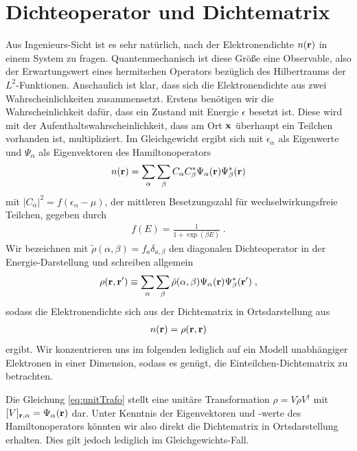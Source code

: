 \section{Dichteoperator und Dichtematrix}
Aus Ingenieurs-Sicht ist es sehr natürlich, nach der Elektronendichte $n(\vb{r})$ in einem System zu fragen. Quantenmechanisch ist diese Größe eine Observable, also der Erwartungswert eines hermitschen Operators bezüglich des Hilbertraums der $L^2$-Funktionen. Anschaulich ist klar, dass sich die Elektronendichte aus zwei Wahrscheinlichkeiten zusammensetzt. Erstens benötigen wir die Wahrscheinlichkeit dafür, dass ein Zustand mit Energie $\epsilon$ besetzt ist. Diese wird mit der  Aufenthaltswahrscheinlichkeit, dass am Ort $\vb{x}$ überhaupt ein Teilchen vorhanden ist, multipliziert. Im Gleichgewicht ergibt sich mit $\epsilon_{\alpha}$ als Eigenwerte und $\Psi_{\alpha}$ als Eigenvektoren des Hamiltonoperators \cite{datta}
\begin{align}
  n(\vb{r}) = \sum_{\alpha} \sum_{\beta} C_{\alpha} C_{\beta}^*\Psi_{\alpha}(\vb{r}) \Psi_{\beta}^*(\vb{r})
\end{align}
mit $|C_{\alpha}|^2 = f(\epsilon_{\alpha}-\mu)$, der mittleren Besetzungszahl für wechselwirkungsfreie Teilchen, gegeben durch
\begin{align}
  f(E) = \frac{1}{1+\exp(\beta E)} \; .
\end{align}
Wir bezeichnen mit $\tilde{\rho}(\alpha,\beta) = f_a\delta_{a,\beta}$ den diagonalen Dichteoperator in der Energie-Darstellung und schreiben allgemein
\begin{align}
  \rho(\vb{r},\vb{r}') \equiv \sum_{\alpha} \sum_{\beta} \tilde{\rho}(\alpha,\beta)\Psi_{\alpha}(\vb{r})\Psi^*_{\beta}(\vb{r}') \; ,
  \label{eq:unitTrafo}
\end{align}
sodass die Elektronendichte sich aus der Dichtematrix in Ortsdarstellung aus
\begin{align}
  n(\vb{r}) = \rho(\vb{r},\vb{r})
  \label{eq:dichteAusRho}
\end{align}
ergibt.
Wir konzentrieren uns im folgenden lediglich auf ein Modell unabhängiger Elektronen in einer Dimension, sodass es genügt, die Einteilchen-Dichtematrix zu betrachten.

Die Gleichung \eqref{eq:unitTrafo} stellt eine unitäre Transformation $\rho = V\tilde{\rho}V^{\dagger}$ mit $[V]_{\vb{r},\alpha} = \Psi_{\alpha}(\vb{r})$ dar. Unter Kenntnis der Eigenvektoren und -werte des Hamiltonoperators könnten wir also direkt die Dichtematrix in Ortsdarstellung erhalten. Dies gilt jedoch lediglich im Gleichgewichts-Fall.

